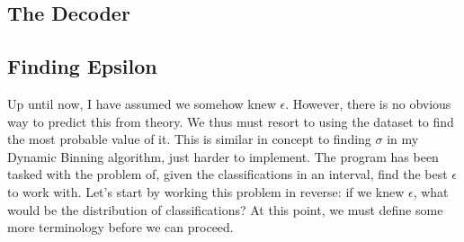 \documentclass{article}
\begin{document}
\subsection{The Decoder}
\subsection{Finding Epsilon}
\indent \indent Up until now, I have assumed we somehow knew $ \epsilon $. However, there is no obvious way to predict this from theory. We thus must resort to using the dataset to find the most probable value of it. This is similar in concept to finding $ \sigma $ in my Dynamic Binning algorithm, just harder to implement. 
\newline
\indent The program has been tasked with the problem of, given the classifications in an interval, find the best $ \epsilon $ to work with. Let's start by working this problem in reverse: if we knew $ \epsilon $, what would be the distribution of classifications? At this point, we must define some more terminology before we can proceed. 
\end{document}
